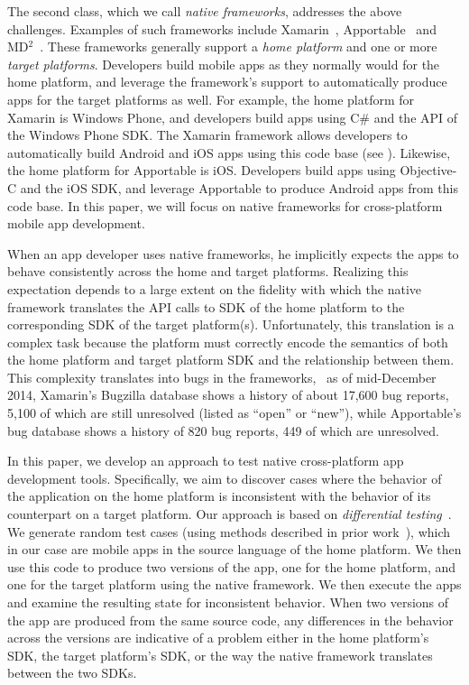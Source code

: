 The second class, which we call \textit{native frameworks}, addresses the above
challenges. Examples of such frameworks include Xamarin~\cite{xamarin},
Apportable~\cite{apportable} and MD$^2$~\cite{md2:sac13,myappconverter}. These
frameworks generally support a \textit{home platform} and one or more
\textit{target platforms}. Developers build mobile apps as they normally would
for the home platform, and leverage the framework's support to automatically
produce apps for the target platforms as well. For example, the home platform
for Xamarin is Windows Phone, and developers build apps using C\# and the API
of the Windows Phone SDK. The Xamarin framework allows developers to
automatically build Android and iOS apps using this code base (see
). Likewise, the home platform for Apportable
is iOS. Developers build apps using Objective-C and the iOS SDK, and leverage
Apportable to produce Android apps from this code base.  In this paper, we will
focus on native frameworks for cross-platform mobile app development. 

When an app developer uses native frameworks, he implicitly expects the apps to
behave consistently across the home and target platforms. Realizing this
expectation depends to a large extent on the fidelity with which the native
framework translates the API calls to SDK of the home platform to the
corresponding SDK of the target platform(s). Unfortunately, this translation is
a complex task because the platform must correctly encode the semantics of both
the home platform and target platform SDK and the relationship between them.
This complexity translates into bugs in the frameworks, \eg~as of mid-December
2014, Xamarin's Bugzilla database shows a history of about 17,600 bug reports,
5,100 of which are still unresolved (listed as ``open'' or ``new''), while
Apportable's bug database shows a history of 820 bug reports, 449 of which are
unresolved.

In this paper, we develop an approach to test native cross-platform app
development tools. Specifically, we aim to discover cases where the behavior of
the application on the home platform is inconsistent with the behavior of its
counterpart on a target platform. Our approach is based on \textit{differential
testing}~\cite{mckeeman:difftest:1998}. We generate random test cases (using
methods described in prior work~\cite{randoop:icse07}), which in our case are
mobile apps in the source language of the home platform. We then use this code
to produce two versions of the app, one for the home platform, and one for the
target platform using the native framework. We then execute the apps and
examine the resulting state for inconsistent behavior.  When two versions of
the app are produced from the same source code, any differences in the behavior
across the versions are indicative of a problem either in the home platform's
SDK, the target platform's SDK, or the way the native framework translates
between the two SDKs.

